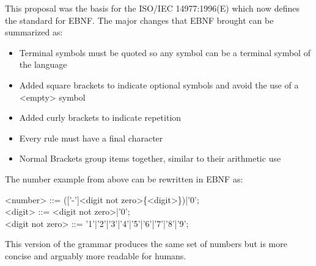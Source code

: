 This proposal was the basis for the ISO/IEC 14977:1996(E) which now defines the standard for \ac{EBNF}. The major changes that \ac{EBNF} brought can be summarized as: \parencite[cf.][p. VI]{isoiec_149771996e_information_1996}
\begin{itemize}[noitemsep]
    \item Terminal symbols must be quoted so any symbol can be a terminal symbol of the language
    \item Added square brackets to indicate optional symbols and avoid the use of a <empty> symbol
    \item Added curly brackets to indicate repetition
    \item Every rule must have a final character
    \item Normal Brackets group items together, similar to their arithmetic use
\end{itemize}
The number example from above can be rewritten in \ac{EBNF} as:
\begin{grammar}
    <number> ::= (['-']<digit not zero>\{<digit>\})|'0'; \\
    <digit> ::= <digit not zero>|'0'; \\
    <digit not zero> ::= '1'|'2'|'3'|'4'|'5'|'6'|'7'|'8'|'9';
\end{grammar}
This version of the grammar produces the same set of numbers but is more concise and arguably more readable for humans.
